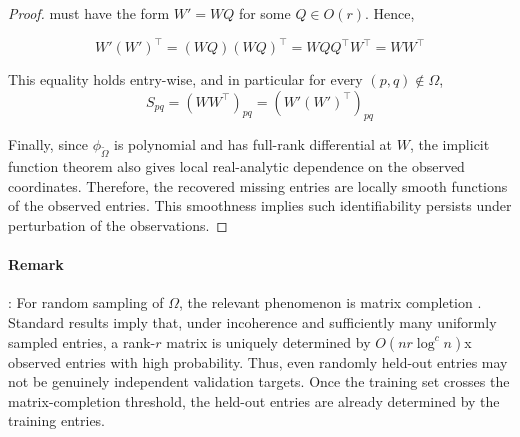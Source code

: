 \documentclass{article}
\begin{document}
\begin{proof}
must have the form $W' = WQ$ for some $Q \in O(r)$. Hence,

\[
W' (W')^{\top} = (WQ)(WQ)^{\top} = WQQ^{\top} W^{\top} = WW^{\top} 
\]

This equality holds entry-wise, and in particular for every $(p, q) \not\in \Omega$, 
\[ 
S_{pq} = (WW^{\top})_{pq} = (W' (W')^{\top})_{pq} 
\]

Finally, since $\phi_{\widetilde{\Omega}}$ is polynomial and has full-rank differential at $W$, the implicit function theorem also gives local real-analytic dependence on the observed coordinates. Therefore, the recovered missing entries are locally smooth functions of the observed entries. This smoothness implies such identifiability persists under perturbation of the observations.
\end{proof}

\paragraph{Remark}: For random sampling of $\Omega$, the relevant phenomenon is matrix completion \citep{CandesRecht2009,Gross2011}. Standard results imply that, under incoherence and sufficiently many uniformly sampled entries, a rank-$r$ matrix is uniquely determined by $O(nr \log^c n)$x   observed entries with high probability. Thus, even randomly held-out entries may not be genuinely independent validation targets. Once the training set crosses the matrix-completion threshold, the held-out entries are already determined by the training entries.

\end{document}
